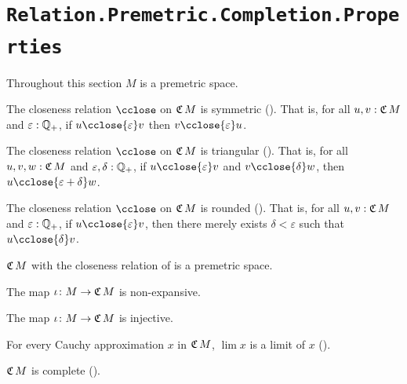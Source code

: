 \section{\texttt{Relation.Premetric.Completion.Properties}}

Throughout this section $M$ is a premetric space.

\begin{lemma}
  \label{isSymClose}
  The closeness relation $\cclose$ on $\mathfrak{C}\,M$ is symmetric (). That is, for all $u, v : \mathfrak{C}\,M$ and $\varepsilon : \mathbb{Q}_{+}$, if $u \cclose{\varepsilon} v$ then $v \cclose{\varepsilon} u$.
\end{lemma}

\begin{lemma}
  \label{isTriangularClose}
  The closeness relation $\cclose$ on $\mathfrak{C}\,M$ is triangular (). That is, for all $u, v, w : \mathfrak{C}\,M$ and $\varepsilon, \delta : \mathbb{Q}_{+}$, if $u \cclose{\varepsilon} v$ and $v \cclose{\delta} w$, then $u \cclose{\varepsilon + \delta} w$.
\end{lemma}

\begin{lemma}
  \label{isRoundedClose}
  The closeness relation $\cclose$ on $\mathfrak{C}\,M$ is rounded (). That is, for all $u, v : \mathfrak{C}\,M$ and $\varepsilon : \mathbb{Q}_{+}$, if $u \cclose{\varepsilon} v$, then there merely exists $\delta < \varepsilon$ such that $u \cclose{\delta} v$.
\end{lemma}

\begin{theorem}
  \label{completionPremetricSpace}
  $\mathfrak{C}\,M$ with the closeness relation of  is a premetric space.
\end{theorem}

\begin{lemma}[\agda{ιⁿ}]
  \label{iotaN}
  The map $\iota \colon M \to \mathfrak{C}\,M$ is non-expansive.
\end{lemma}

\begin{lemma}
  \label{isInjectiveIota}
  The map $\iota \colon M \to \mathfrak{C}\,M$ is injective.
\end{lemma}

\begin{theorem}
  \label{isLimitLim}
  For every Cauchy approximation $x$ in $\mathfrak{C}\,M$, $\lim x$ is a limit of $x$ ().
\end{theorem}

\begin{corollary}
  \label{isCompleteCompletion}
  $\mathfrak{C}\,M$ is complete ().
\end{corollary}
